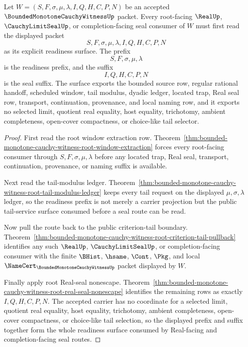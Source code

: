 \begin{theorem}\label{thm:bounded-monotone-cauchy-witness-root-window-readiness}
Let $W=(S,F,\sigma,\mu,\lambda,I,Q,H,C,P,N)$ be an accepted $\BoundedMonotoneCauchyWitnessUp$ packet. Every root-facing $\RealUp$, $\CauchyLimitSealUp$, or completion-facing seal consumer of $W$ must first read the displayed packet
$$
S,F,\sigma,\mu,\lambda,I,Q,H,C,P,N
$$
as its explicit readiness surface. The prefix
$$
S,F,\sigma,\mu,\lambda
$$
is the readiness prefix, and the suffix
$$
I,Q,H,C,P,N
$$
is the seal suffix. The surface exports the bounded source row, regular rational handoff, scheduled window, tail modulus, dyadic ledger, located trap, Real seal row, transport, continuation, provenance, and local naming row, and it exports no selected limit, quotient real equality, host equality, trichotomy, ambient completeness, open-cover compactness, or choice-like tail selector.
\end{theorem}
\begin{proof}
First read the root window extraction row. Theorem~\ref{thm:bounded-monotone-cauchy-witness-root-window-extraction} forces every root-facing consumer through $S,F,\sigma,\mu,\lambda$ before any located trap, Real seal, transport, continuation, provenance, or naming suffix is available.

Next read the tail-modulus ledger. Theorem~\ref{thm:bounded-monotone-cauchy-witness-root-tail-modulus-ledger} keeps every tail request on the displayed $\mu,\sigma,\lambda$ ledger, so the readiness prefix is not merely a carrier projection but the public tail-service surface consumed before a seal route can be read.

Now pull the route back to the public criterion-tail boundary. Theorem~\ref{thm:bounded-monotone-cauchy-witness-root-criterion-tail-pullback} identifies any such $\RealUp$, $\CauchyLimitSealUp$, or completion-facing consumer with the finite $\BHist$, $\hsame$, $\Cont$, $\Pkg$, and local $\NameCert_{\BoundedMonotoneCauchyWitnessUp}$ packet displayed by $W$.

Finally apply root Real-seal nonescape. Theorem~\ref{thm:bounded-monotone-cauchy-witness-root-real-seal-nonescape} identifies the remaining rows as exactly $I,Q,H,C,P,N$. The accepted carrier has no coordinate for a selected limit, quotient real equality, host equality, trichotomy, ambient completeness, open-cover compactness, or choice-like tail selection, so the displayed prefix and suffix together form the whole readiness surface consumed by Real-facing and completion-facing seal routes.
\end{proof}

